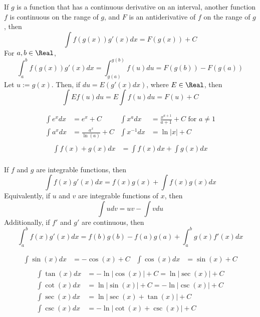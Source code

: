 \begin{theorem}
  If $g$ is a function that has a continuous derivative on an interval, another function $f$ is continuous on the range of $g$, and $F$ is an antiderivative of $f$ on the range of $g$, then
  \[
    \int f(g(x)) g'(x) dx = F(g(x)) + C
  \]
  For $a, b \in \Real$,
  \[
    \int_a^b f(g(x))g'(x)dx = \int_{g(a)}^{g(b)} f(u) du = F(g(b)) - F(g(a))
  \]
  Let $u := g(x)$. Then, if $du = E (g'(x) dx)$, where $E \in \Real$, then 
  \[
    \int E f(u) du = E \int f(u) du = F(u) + C
  \]
\end{theorem}

\begin{theorem}
  \[\begin{aligned}
    \int e^x dx &= e^x + C & \int x^a dx &= \frac{x^{a + 1}}{a + 1} + C \text{ for } a \neq 1 \\
    \int a^x dx &= \frac{a^x}{\ln(a)} + C & \int x^{-1} dx &= \ln |x| + C \\
  \end{aligned}\]\[\begin{aligned}
    \int f(x) + g(x) dx &= \int f(x) dx + \int g(x) dx \\
  \end{aligned}\]
\end{theorem}

\begin{theorem}
  If $f$ and $g$ are integrable functions, then
  \[
    \int f(x) g'(x) dx = f(x) g(x) + \int f(x) g(x) dx
  \]
  Equivalently, if $u$ and $v$ are integrable functions of $x$, then
  \[
    \int udv = uv - \int vdu
  \]
  Additionally, if $f'$ and $g'$ are continuous, then
  \[
    \int_a^b f(x) g'(x) dx = f(b)g(b) - f(a)g(a) + \int_a^b g(x) f'(x) dx
  \]
\end{theorem}

\begin{theorem}
  \[\begin{aligned}
    \int \sin(x) dx &= -\cos(x) + C & \int \cos(x) dx &= \sin(x) + C \\
  \end{aligned}\]
  \[\begin{aligned}
    \int \tan(x) dx &= -\ln |\cos(x)| + C = \ln |\sec(x)| + C \\
    \int \cot(x) dx &= \ln |\sin(x)| + C = -\ln |\csc(x)| + C \\
    \int \sec(x) dx &= \ln |\sec(x) + \tan(x)| + C \\
    \int \csc(x) dx &= -\ln |\cot(x) + \csc(x)| + C
  \end{aligned}\]
\end{theorem}


